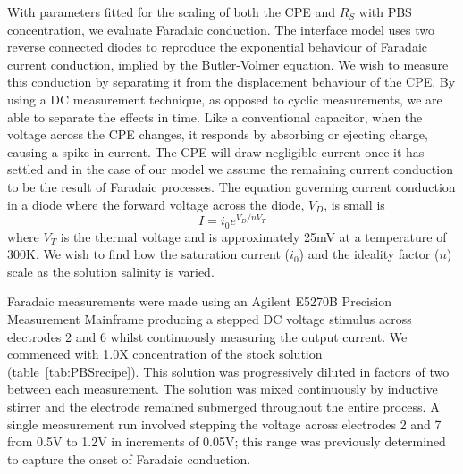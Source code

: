 \documentclass[10pt,final,journal]{IEEEtran}
\begin{document}
With parameters fitted for the scaling of both the CPE and $R_{S}$ with PBS concentration, we evaluate Faradaic conduction. The interface model uses two reverse connected diodes to reproduce the exponential behaviour of Faradaic current conduction, implied by the Butler-Volmer equation. We wish to measure this conduction by separating it from the displacement behaviour of the CPE. By using a DC measurement technique, as opposed to cyclic measurements, we are able to separate the effects in time. Like a conventional capacitor, when the voltage across the CPE changes, it responds by absorbing or ejecting charge, causing a spike in current. The CPE will draw negligible current once it has settled and in the case of our model we assume the remaining current conduction to be the result of Faradaic processes. The equation governing current conduction in a diode where the forward voltage across the diode, $V_{D}$, is small is
\begin{equation}
    I = i_{0}  e^{V_{D} / n V_{T}}
\end{equation}
where $V_{T}$ is the thermal voltage and is approximately 25\thinspace mV at a temperature of 300\thinspace K. We wish to find how the saturation current ($i_{0}$) and the ideality factor ($n$) scale as the solution salinity is varied.

Faradaic measurements were made using an Agilent E5270B Precision Measurement Mainframe producing a stepped DC voltage stimulus across electrodes 2 and 6 whilst continuously measuring the output current. We commenced with 1.0X concentration of the stock solution (table~\ref{tab:PBSrecipe}). This solution was progressively diluted in factors of two between each measurement. The solution was mixed continuously by inductive stirrer and the electrode remained submerged throughout the entire process.
A single measurement run involved stepping the voltage across electrodes 2 and 7 from 0.5\thinspace V to 1.2\thinspace V in increments of 0.05\thinspace V; this range was previously determined to capture the onset of Faradaic conduction.
\end{document}
